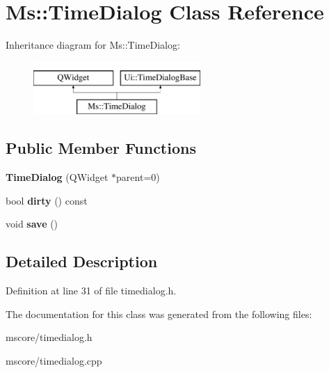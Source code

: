 \hypertarget{class_ms_1_1_time_dialog}{}\section{Ms\+:\+:Time\+Dialog Class Reference}
\label{class_ms_1_1_time_dialog}
Inheritance diagram for Ms\+:\+:Time\+Dialog\+:\begin{figure}[H]
\begin{center}
\leavevmode
\includegraphics[height=2.000000cm]{class_ms_1_1_time_dialog}
\end{center}
\end{figure}
\subsection*{Public Member Functions}
\begin{DoxyCompactItemize}
\item 
\mbox{\label{class_ms_1_1_time_dialog_a92d78393010b31c67433574a32730e7a}} 
{\bfseries Time\+Dialog} (Q\+Widget $\ast$parent=0)
\item 
\mbox{\label{class_ms_1_1_time_dialog_a4bc601d987a21d29c767a0069c2e98c2}} 
bool {\bfseries dirty} () const
\item 
\mbox{\label{class_ms_1_1_time_dialog_a67b6c885a35626a89f0b2d4e5544c869}} 
void {\bfseries save} ()
\end{DoxyCompactItemize}


\subsection{Detailed Description}


Definition at line 31 of file timedialog.\+h.



The documentation for this class was generated from the following files\+:\begin{DoxyCompactItemize}
\item 
mscore/timedialog.\+h\item 
mscore/timedialog.\+cpp\end{DoxyCompactItemize}
